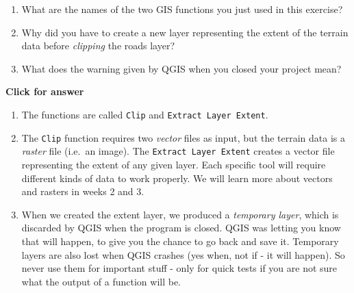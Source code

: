 \documentclass[
  letterpaper,
  DIV=11,
  numbers=noendperiod]{scrreprt}
\begin{document}
\begin{tcolorbox}[enhanced jigsaw, breakable, toptitle=1mm, colback=white, left=2mm, leftrule=.75mm, titlerule=0mm, colframe=quarto-callout-important-color-frame, opacityback=0, title=\textcolor{quarto-callout-important-color}{\faExclamation}\hspace{0.5em}{Stop and Think}, toprule=.15mm, opacitybacktitle=0.6, bottomtitle=1mm, colbacktitle=quarto-callout-important-color!10!white, bottomrule=.15mm, coltitle=black, rightrule=.15mm, arc=.35mm]

\begin{enumerate}
\def\labelenumi{\alph{enumi})}
\item
  What are the names of the two GIS functions you just used in this
  exercise?
\item
  Why did you have to create a new layer representing the extent of the
  terrain data before \emph{clipping} the roads layer?
\item
  What does the warning given by QGIS when you closed your project mean?
\end{enumerate}

\end{tcolorbox}

\begin{tcolorbox}[enhanced jigsaw, leftrule=.75mm, colframe=quarto-callout-important-color-frame, breakable, toprule=.15mm, bottomrule=.15mm, arc=.35mm, rightrule=.15mm, opacityback=0, colback=white, left=2mm]

\vspace{-3mm}\textbf{Click for answer}\vspace{3mm}

\begin{enumerate}
\def\labelenumi{\alph{enumi})}
\item
  The functions are called \texttt{Clip} and
  \texttt{Extract\ Layer\ Extent}.
\item
  The \texttt{Clip} function requires two \emph{vector} files as input,
  but the terrain data is a \emph{raster} file (i.e.~an image). The
  \texttt{Extract\ Layer\ Extent} creates a vector file representing the
  extent of any given layer. Each specific tool will require different
  kinds of data to work properly. We will learn more about vectors and
  rasters in weeks 2 and 3.
\item
  When we created the extent layer, we produced a \emph{temporary
  layer}, which is discarded by QGIS when the program is closed. QGIS
  was letting you know that will happen, to give you the chance to go
  back and save it. Temporary layers are also lost when QGIS crashes
  (yes when, not if - it will happen). So never use them for important
  stuff - only for quick tests if you are not sure what the output of a
  function will be.\\
\end{enumerate}

\end{tcolorbox}
\end{document}
